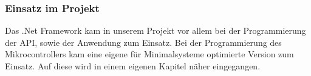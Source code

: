 \subsubsection{Einsatz im Projekt}
Das .Net Framework kam in unserem Projekt vor allem bei der Programmierung der API, sowie der Anwendung zum Einsatz. Bei der Programmierung des Mikrocontrollers kam eine eigene für Minimalsysteme optimierte Version zum Einsatz. Auf diese wird in einem eigenen Kapitel näher eingegangen.

